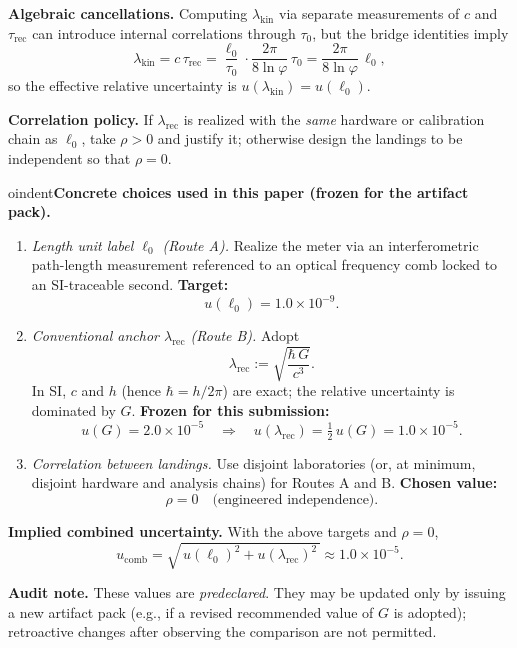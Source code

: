 \documentclass[11pt]{article}
\theoremstyle{plain}
\theoremstyle{definition}
\theoremstyle{remark}
\begin{document}
\begin{remark}
\textbf{Algebraic cancellations.} Computing \(\lambda_{\mathrm{kin}}\) via separate measurements of \(c\) and \(\tau_{\mathrm{rec}}\) can introduce internal correlations through \(\tau_{0}\), but the bridge identities imply
\[
\lambda_{\mathrm{kin}}=c\,\tau_{\mathrm{rec}}=\frac{\ell_{0}}{\tau_{0}}\cdot\frac{2\pi}{8\ln\varphi}\,\tau_{0}=\frac{2\pi}{8\ln\varphi}\,\ell_{0},
\]
so the effective relative uncertainty is \(u(\lambda_{\mathrm{kin}})=u(\ell_{0})\).

\textbf{Correlation policy.} If \(\lambda_{\mathrm{rec}}\) is realized with the \emph{same} hardware or calibration chain as \(\ell_{0}\), take \(\rho>0\) and justify it; otherwise design the landings to be independent so that \(\rho=0\).

\medskip

oindent\textbf{Concrete choices used in this paper (frozen for the artifact pack).}
\begin{enumerate}
  \item \emph{Length unit label \(\ell_{0}\) (Route A).} Realize the meter via an interferometric path-length measurement referenced to an optical frequency comb locked to an SI-traceable second. \textbf{Target:}
  \[
  u(\ell_{0})=1.0\times10^{-9}.
  \]
  \item \emph{Conventional anchor \(\lambda_{\mathrm{rec}}\) (Route B).} Adopt
  \[
  \lambda_{\mathrm{rec}}:=\sqrt{\frac{\hbar\,G}{c^{3}}}.
  \]
  In SI, \(c\) and \(h\) (hence \(\hbar=h/2\pi\)) are exact; the relative uncertainty is dominated by \(G\). \textbf{Frozen for this submission:}
  \[
  u(G)=2.0\times10^{-5}\quad\Longrightarrow\quad u(\lambda_{\mathrm{rec}})=\tfrac12\,u(G)=1.0\times10^{-5}.
  \]
  \item \emph{Correlation between landings.} Use disjoint laboratories (or, at minimum, disjoint hardware and analysis chains) for Routes A and B. \textbf{Chosen value:}
  \[
  \rho=0\quad\text{(engineered independence)}.
  \]
\end{enumerate}

\textbf{Implied combined uncertainty.} With the above targets and \(\rho=0\),
\[
u_{\mathrm{comb}}=\sqrt{\,u(\ell_{0})^{2}+u(\lambda_{\mathrm{rec}})^{2}\,}\approx 1.0\times10^{-5}.
\]

\textbf{Audit note.} These values are \emph{predeclared}. They may be updated only by issuing a new artifact pack (e.g., if a revised recommended value of \(G\) is adopted); retroactive changes after observing the comparison are not permitted.
\end{remark}
\end{document}

